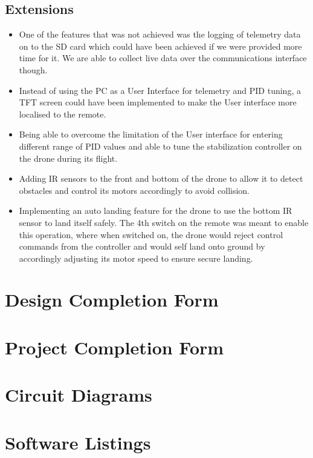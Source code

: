 \documentclass[a4paper,11pt]{article}
\begin{document}
\subsection{Extensions}
\begin{itemize}
    \item One of the features that was not achieved was the logging of telemetry data on to the SD card which could have been achieved if we were provided more time for it. We are able to collect live data over the communications interface though. 
    \item Instead of using the PC as a User Interface for telemetry and PID tuning, a TFT screen could have been implemented to make the User interface more localised to the remote.
    \item Being able to overcome the limitation of the User interface for entering different range of PID values and able to tune the stabilization controller on the drone during its flight.
    \item Adding IR sensors to the front and bottom of the drone to allow it to detect obstacles and control its motors accordingly to avoid collision.
    \item Implementing an auto landing feature for the drone to use the bottom IR sensor to land itself safely. The 4th switch on the remote was meant to enable this operation, where when switched on, the drone would reject control commands from the controller and would self land onto ground by accordingly adjusting its motor speed to ensure secure landing.
\end{itemize}




\appendix
\newpage
\section{Design Completion Form}

\newpage
\section{Project Completion Form}

\newpage
\section{Circuit Diagrams}

\newpage
\section{Software Listings}
\end{document}
